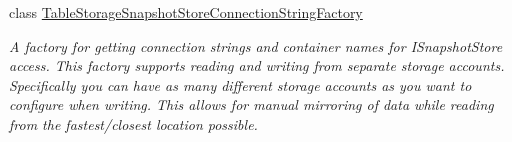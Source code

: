 \begin{DoxyCompactItemize}
class \hyperlink{classCqrs_1_1Azure_1_1BlobStorage_1_1Events_1_1TableStorageSnapshotStoreConnectionStringFactory}{Table\+Storage\+Snapshot\+Store\+Connection\+String\+Factory}
\begin{DoxyCompactList}\small\item\em A factory for getting connection strings and container names for I\+Snapshot\+Store access. This factory supports reading and writing from separate storage accounts. Specifically you can have as many different storage accounts as you want to configure when writing. This allows for manual mirroring of data while reading from the fastest/closest location possible. \end{DoxyCompactList}\end{DoxyCompactItemize}
